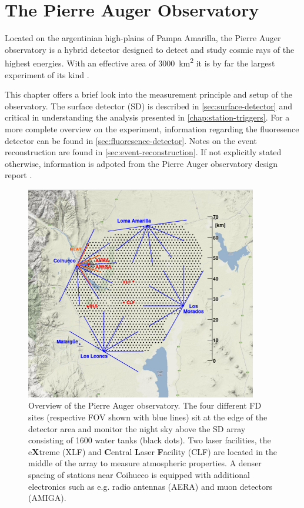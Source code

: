 
\chapter{The Pierre Auger Observatory}
\label{chap:auger-observatory}

Located on the argentinian high-plains of Pampa Amarilla, the Pierre Auger observatory is a hybrid detector designed to detect and study cosmic 
rays of the highest energies. With an effective area of \SI{3000}{\kilo\meter\squared} it is by far the largest experiment of its kind 
\cite{DesignReport}.

This chapter offers a brief look into the measurement principle and setup of the observatory. The  surface detector (SD) is described in 
\autoref{sec:surface-detector} and critical in understanding the analysis presented in \autoref{chap:station-triggers}. For a more complete 
overview on the experiment, information regarding the fluoresence detector can be found in \autoref{sec:fluoresence-detector}. Notes on the event
reconstruction are found in \autoref{sec:event-reconstruction}. If not explicitly stated otherwise, information is adpoted from the Pierre Auger 
observatory design report \cite{DesignReport}.

\begin{figure}
	\centering
	\includegraphics[width=0.9\textwidth]{plots/auger_array.png}
	\caption{Overview of the Pierre Auger observatory. The four different FD sites (respective FOV shown with blue lines) sit at the edge of
	the detector area and monitor the night sky above the SD array consisting of 1600 water tanks (black dots). Two laser facilities, the 
	e\textbf{X}treme (XLF) and \textbf{C}entral \textbf{L}aser \textbf{F}acility (CLF) are located in the middle of the array to measure 
	atmospheric properties. A denser spacing of stations near Coihueco is equipped with additional electronics such as e.g. radio antennas 
	(AERA) and muon detectors (AMIGA).}
	\label{fig:auger-array}
\end{figure}

